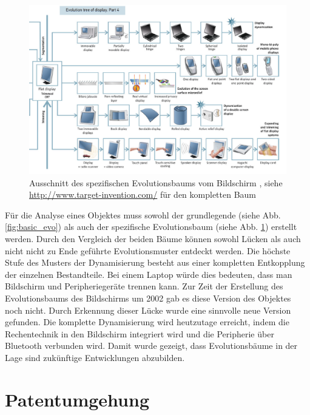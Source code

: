 \documentclass[11pt,a4paper]{article}
\begin{document}
\begin{figure}[htb]
	\centering
	\includegraphics[width=0.9\linewidth]{figures/removable display.PNG}
	\caption{\small Ausschnitt des spezifischen Evolutionsbaums vom Bildschirm \cite{evo}, siehe \url{http://www.target-invention.com/} für den kompletten Baum}
	\label{fig:spez_evo}
\end{figure}


Für die Analyse eines Objektes muss sowohl der grundlegende (siehe Abb. \ref{fig:basic_evo}) als auch der spezifische Evolutionsbaum (siehe Abb. \ref{fig:spez_evo}) erstellt werden. Durch den Vergleich der beiden Bäume können sowohl Lücken als auch nicht nicht zu Ende geführte Evolutionsmuster entdeckt werden. Die höchste Stufe des Musters der Dynamisierung besteht aus einer kompletten Entkopplung der einzelnen Bestandteile. Bei einem Laptop würde dies bedeuten, dass man Bildschirm und Peripheriegeräte trennen kann. Zur Zeit der Erstellung des Evolutionsbaums des Bildschirms um 2002 gab es diese Version des Objektes noch nicht. Durch Erkennung dieser Lücke wurde eine sinnvolle neue Version gefunden. Die komplette Dynamisierung wird heutzutage erreicht, indem die Rechentechnik in den Bildschirm integriert wird und die Peripherie über Bluetooth verbunden wird. Damit wurde gezeigt, dass Evolutionsbäume in der Lage sind zukünftige Entwicklungen abzubilden.

\section{Patentumgehung}
\end{document}
